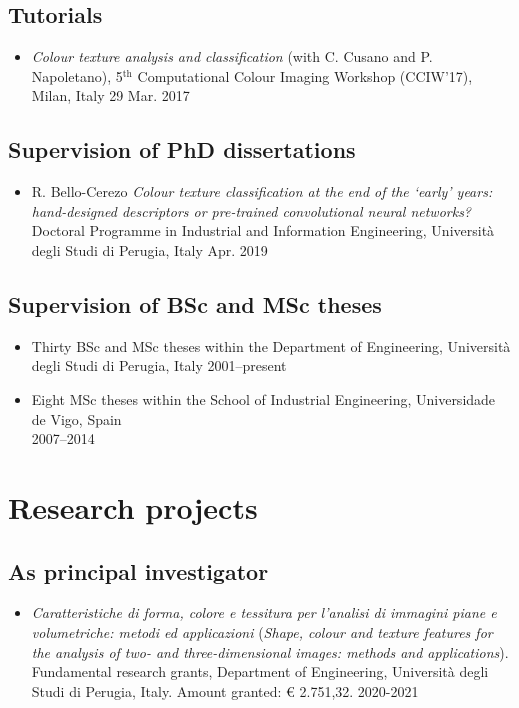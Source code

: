 \documentclass[11pt]{article}
\begin{document}
\subsection*{Tutorials}

\begin{itemize}
	\item \emph{Colour texture analysis and classification} (with C. Cusano and P. Napoletano), 5$^\text{th}$ Computational Colour Imaging Workshop (CCIW’17), Milan, Italy \hfill 29 Mar. 2017
\end{itemize}

\subsection*{Supervision of PhD dissertations}

\begin{itemize}
	\item R. Bello-Cerezo \emph{Colour texture classification at the end of the `early' years: hand-designed descriptors or pre-trained convolutional neural networks?} Doctoral Programme in Industrial and Information Engineering, Università degli Studi di Perugia, Italy \hfill Apr. 2019
\end{itemize}

\subsection*{Supervision of BSc and MSc theses}

\begin{itemize}
	\item Thirty BSc and MSc theses within the Department of Engineering, Università degli Studi di Perugia, Italy \hfill 2001--present
	\item Eight MSc theses within the School of Industrial Engineering, Universidade de Vigo, Spain \\ \mbox{} \hfill 2007--2014
\end{itemize}

\section*{Research projects}

\subsection*{As principal investigator}

\begin{itemize}
	\item \emph{Caratteristiche di forma, colore e tessitura per l’analisi di immagini piane e volumetriche: metodi ed applicazioni} (\emph{Shape, colour and texture features for the analysis of two- and three-dimensional images: methods and applications}). Fundamental research grants, Department of Engineering, Università degli Studi di Perugia, Italy. Amount granted: € 2.751,32. \hfill 2020-2021
\end{itemize}
\end{document}
